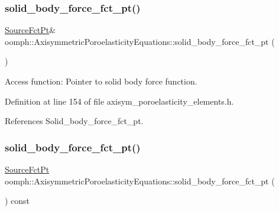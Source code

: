 \subsubsection{\texorpdfstring{solid\+\_\+body\+\_\+force\+\_\+fct\+\_\+pt()}{solid\_body\_force\_fct\_pt()}\hspace{0.1cm}{\footnotesize\ttfamily [1/2]}}
{\footnotesize\ttfamily \hyperlink{classoomph_1_1AxisymmetricPoroelasticityEquations_a7a2c87557c3d9d405bb07a9f53bb4abe}{Source\+Fct\+Pt}\& oomph\+::\+Axisymmetric\+Poroelasticity\+Equations\+::solid\+\_\+body\+\_\+force\+\_\+fct\+\_\+pt (\begin{DoxyParamCaption}{ }\end{DoxyParamCaption})\hspace{0.3cm}{\ttfamily [inline]}}



Access function\+: Pointer to solid body force function. 



Definition at line 154 of file axisym\+\_\+poroelasticity\+\_\+elements.\+h.



References Solid\+\_\+body\+\_\+force\+\_\+fct\+\_\+pt.

\mbox{\label{classoomph_1_1AxisymmetricPoroelasticityEquations_ab70f4de2bd58e382632cd805df108a15}} 
\subsubsection{\texorpdfstring{solid\+\_\+body\+\_\+force\+\_\+fct\+\_\+pt()}{solid\_body\_force\_fct\_pt()}\hspace{0.1cm}{\footnotesize\ttfamily [2/2]}}
{\footnotesize\ttfamily \hyperlink{classoomph_1_1AxisymmetricPoroelasticityEquations_a7a2c87557c3d9d405bb07a9f53bb4abe}{Source\+Fct\+Pt} oomph\+::\+Axisymmetric\+Poroelasticity\+Equations\+::solid\+\_\+body\+\_\+force\+\_\+fct\+\_\+pt (\begin{DoxyParamCaption}{ }\end{DoxyParamCaption}) const\hspace{0.3cm}{\ttfamily [inline]}}



